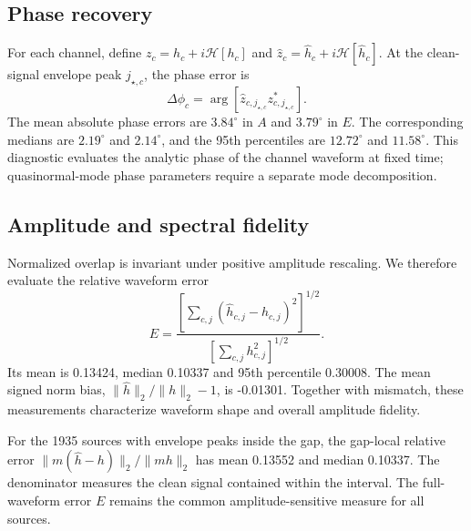\documentclass[10pt,prd,aps,a4paper,twocolumn,superscriptaddress,nofootinbib,floatfix]{revtex4-2}
\begin{document}
\subsection{Phase recovery}\label{subsec:PhaseRecoveryAlignment}
For each channel, define $z_c=h_c+i\mathcal H[h_c]$ and $\widehat z_c=\widehat h_c+i\mathcal H[\widehat h_c]$. At the clean-signal envelope peak $j_{\star,c}$, the phase error is
\begin{equation}
\Delta\phi_c=\arg[\widehat z_{c,j_{\star,c}}z_{c,j_{\star,c}}^*].
\end{equation}
The mean absolute phase errors are $3.84^\circ$ in $A$ and $3.79^\circ$ in $E$. The corresponding medians are $2.19^\circ$ and $2.14^\circ$, and the 95th percentiles are $12.72^\circ$ and $11.58^\circ$. This diagnostic evaluates the analytic phase of the channel waveform at fixed time; quasinormal-mode phase parameters require a separate mode decomposition.


\subsection{Amplitude and spectral fidelity}\label{subsec:MeanSquaredError}\label{subsec:AmplitudeDensityFrequencySpectrum}
Normalized overlap is invariant under positive amplitude rescaling. We therefore evaluate the relative waveform error
\begin{equation}
E=\frac{\left[\sum_{c,j}(\widehat h_{c,j}-h_{c,j})^2\right]^{1/2}}{\left[\sum_{c,j}h_{c,j}^2\right]^{1/2}}.
\end{equation}
Its mean is 0.13424, median 0.10337 and 95th percentile 0.30008. The mean signed norm bias, $\|\widehat h\|_2/\|h\|_2-1$, is -0.01301. Together with mismatch, these measurements characterize waveform shape and overall amplitude fidelity.

For the 1935 sources with envelope peaks inside the gap, the gap-local relative error $\|m(\widehat h-h)\|_2/\|mh\|_2$ has mean 0.13552 and median 0.10337. The denominator measures the clean signal contained within the interval. The full-waveform error $E$ remains the common amplitude-sensitive measure for all sources.
\end{document}
